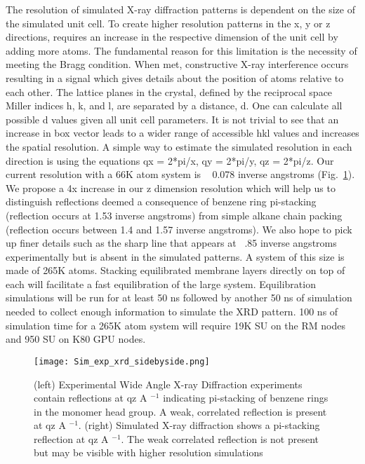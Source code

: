 The resolution of simulated X-ray diffraction patterns is dependent on the
size of the simulated unit cell. To create higher resolution patterns in 
the x, y or z directions, requires an increase in the respective dimension
of the unit cell by adding more atoms. The fundamental reason for this
limitation is the necessity of meeting the Bragg condition. When met,
constructive X-ray interference occurs resulting in a signal which gives
details about the position of atoms relative to each other. The lattice
planes in the crystal, defined by the reciprocal space Miller indices 
h, k, and l, are separated by a distance, d. One can calculate all possible
d values given all unit cell parameters. It is not trivial to see that an
increase in box vector leads to a wider range of accessible hkl values 
and increases the spatial resolution. A simple way to estimate the simulated
resolution in each direction is using the equations qx = 2*pi/x, qy = 2*pi/y,
qz = 2*pi/z. Our current resolution with a 66K atom system is ~ 0.078 inverse
angstroms (Fig.~\ref{fig:expxrdcomp}). We propose a 4x increase in our z dimension resolution which will
help us to distinguish reflections deemed a consequence of benzene ring 
pi-stacking (reflection occurs at 1.53 inverse angstroms) from simple
alkane chain packing (reflection occurs between 1.4 and 1.57 inverse
angstroms). We also hope to pick up finer details such as the sharp line
that appears at ~.85 inverse angstroms experimentally but is absent in 
the simulated patterns. A system of this size is made of 265K atoms. 
Stacking equilibrated membrane layers directly on top of each will 
facilitate a fast equilibration of the large system. Equilibration 
simulations will be run for at least 50 ns followed by another 50 ns of 
simulation needed to collect enough information to simulate the XRD 
pattern. 100 ns of simulation time for a 265K atom system will require 
19K SU on the RM nodes and 950 SU on K80 GPU nodes.     

\begin{figure}
\centering
\texttt{[image: Sim\_exp\_xrd\_sidebyside.png]}
	\caption{(left) Experimental Wide Angle X-ray Diffraction experiments contain
reflections at qz  A $^{-1}$ indicating pi-stacking of benzene
rings in the monomer head group. A weak, correlated reflection is present at 
qz  A $^{-1}$. (right) Simulated X-ray diffraction shows a pi-stacking reflection
at qz  A $^{-1}$. The weak correlated reflection is not
present but may be visible with higher resolution simulations}
	\label{fig:expxrdcomp}

\end{figure}

